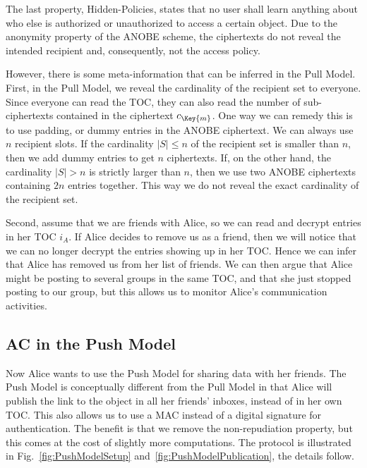 The last property, Hidden-Policies, states that no user shall learn anything 
about who else is authorized or unauthorized to access a certain object.
Due to the anonymity property of the \ac{ANOBE} scheme, the ciphertexts do not 
reveal the intended recipient and, consequently, not the access policy.

However, there is some meta-information that can be inferred in the Pull Model.
First, in the Pull Model, we reveal the cardinality of the recipient set to 
everyone.
Since everyone can read the \ac{TOC}, they can also read the number of 
sub-ciphertexts contained in the ciphertext \(c_{\Key{m}}\).
One way we can remedy this is to use padding, or dummy entries in the 
\ac{ANOBE} ciphertext.
We can always use \(n\) recipient slots.
If the cardinality \(|S|\leq n\) of the recipient set is smaller than \(n\), 
then we add dummy entries to get \(n\) ciphertexts.
If, on the other hand, the cardinality \(|S| > n\) is strictly larger than 
\(n\), then we use two \ac{ANOBE} ciphertexts containing \(2n\) entries 
together.
This way we do not reveal the exact cardinality of the recipient set.

Second, assume that we are friends with Alice, so we can read and decrypt 
entries in her \ac{TOC} \(i_A\).
If Alice decides to remove us as a friend, then we will notice that we can no 
longer decrypt the entries showing up in her \ac{TOC}.
Hence we can infer that Alice has removed us from her list of friends.
We can then argue that Alice might be posting to several groups in the same 
\ac{TOC}, and that she just stopped posting to our group, but this allows us to 
monitor Alice's communication activities.

\subsection{\acl{AC} in the Push Model}\label{sec:PushModelAC}

Now Alice wants to use the Push Model for sharing data with her friends.
The Push Model is conceptually different from the Pull Model in that Alice will 
publish the link to the object in all her friends' inboxes, instead of in her 
own \ac{TOC}.
This also allows us to use a \ac{MAC} instead of a digital signature for 
authentication.
The benefit is that we remove the non-repudiation property, but this comes at 
the cost of slightly more computations.
The protocol is illustrated in Fig.~\ref{fig:PushModelSetup} 
and~\ref{fig:PushModelPublication}, the details follow.

